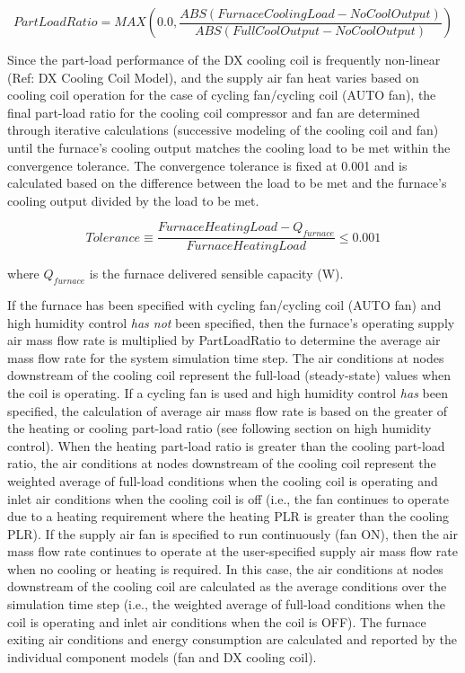 \begin{equation}
PartLoadRatio = MAX\left( {0.0,\frac{{ABS\left( {FurnaceCoolingLoad - NoCoolOutput} \right)}}{{ABS\left( {FullCoolOutput - NoCoolOutput} \right)}}} \right)
\label{eq:FurnacePartLoadRatio580}
\end{equation}

Since the part-load performance of the DX cooling coil is frequently non-linear (Ref: DX Cooling Coil Model), and the supply air fan heat varies based on cooling coil operation for the case of cycling fan/cycling coil (AUTO fan), the final part-load ratio for the cooling coil compressor and fan are determined through iterative calculations (successive modeling of the cooling coil and fan) until the furnace's cooling output matches the cooling load to be met within the convergence tolerance. The convergence tolerance is fixed at 0.001 and is calculated based on the difference between the load to be met and the furnace's cooling output divided by the load to be met.

\begin{equation}
  Tolerance \equiv \frac{FurnaceHeatingLoad - Q_{furnace}}{FurnaceHeatingLoad} \leq 0.001
\end{equation}

where \({Q_{furnace}}\) is the furnace delivered sensible capacity (W).

If the furnace has been specified with cycling fan/cycling coil (AUTO fan) and high humidity control \emph{has not} been specified, then the furnace's operating supply air mass flow rate is multiplied by PartLoadRatio to determine the average air mass flow rate for the system simulation time step. The air conditions at nodes downstream of the cooling coil represent the full-load (steady-state) values when the coil is operating. If a cycling fan is used and high humidity control \emph{has} been specified, the calculation of average air mass flow rate is based on the greater of the heating or cooling part-load ratio (see following section on high humidity control). When the heating part-load ratio is greater than the cooling part-load ratio, the air conditions at nodes downstream of the cooling coil represent the weighted average of full-load conditions when the cooling coil is operating and inlet air conditions when the cooling coil is off (i.e., the fan continues to operate due to a heating requirement where the heating PLR is greater than the cooling PLR). If the supply air fan is specified to run continuously (fan ON), then the air mass flow rate continues to operate at the user-specified supply air mass flow rate when no cooling or heating is required. In this case, the air conditions at nodes downstream of the cooling coil are calculated as the average conditions over the simulation time step (i.e., the weighted average of full-load conditions when the coil is operating and inlet air conditions when the coil is OFF). The furnace exiting air conditions and energy consumption are calculated and reported by the individual component models (fan and DX cooling coil).

